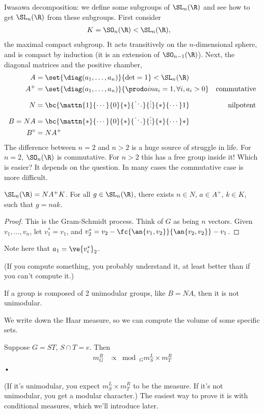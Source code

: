 Iwasawa decomposition: we define some subgroups of $\SL_n(\R)$ and see how to get $\SL_n(\R)$ from these subgroups. First consider
\begin{align}
K&=\SO_n(\R)<\SL_n(\R),
\end{align}
the maximal compact subgroup.
It acts transitively on the $n$-dimensional sphere, and is compact by induction (it is an extension of $\SO_{n-1}(\R)$).
Next, the diagonal matrices and the positive chamber,
\begin{align}
A &= \set{\diag(a_1,\ldots, a_n)}{\det = 1}<\SL_n(\R)\\
A^+ &= \set{\diag(a_1,\ldots, a_n)}{\prodo in a_i = 1, \forall i, a_i>0}& \text{commutative}\\
N&= \bc{\mattn{1}{\cdots}{0}{*}{\ddots}{\vdots}{*}{\cdots}1} &\text{nilpotent}\\
B=NA &= \bc{\mattn{*}{\cdots}{0}{*}{\ddots}{\vdots}{*}{\cdots}*}\\
B^{\circ} &= NA^+
\end{align}
The difference between $n=2$ and $n>2$ is a huge source of struggle in life. For $n=2$, $\SO_n(\R)$ is commutative. For $n>2$ this has a free group inside it! Which is easier? It depends on the question. In many cases the commutative case is more difficult.

\begin{pr}
$\SL_n(\R)=NA^+K$. For all $g\in \SL_n(\R)$, there exists $n\in N$, $a\in A^+$, $k\in K$, such that $g = nak$.
\end{pr}
\begin{proof}
 This is the Gram-Schmidt process. Think of $G$ as being $n$ vectors. 
Given $v_1,\ldots, v_n$, let $v_1^*=v_1$, and $v_2^* = v_2 - \fc{\an{v_1,v_2}}{\an{v_2,v_2}} - v_1$. 
\end{proof}
Note here that $a_1 = \ve{v_i^*}_2$.

(If you compute something, you probably understand it, at least better than if you can't compute it.)

If a group is composed of 2 unimodular groups, like $B=NA$, then it is not unimodular. 

We write down the Haar measure, so we can compute the volume of some specific sets.
\begin{pr}
Suppose $G=ST$, $S\cap T=e$. Then 
\begin{align}
m_G^R &\propto \bmod_G m_S^L \times m_T^R
\end{align}•
\end{pr}
(If it's unimodular, you expect $m_S^L\times m_T^R$ to be the measure. If it's not unimodular, you get a modular character.)
The easiest way to prove it is with conditional measures, which we'll introduce later. 


